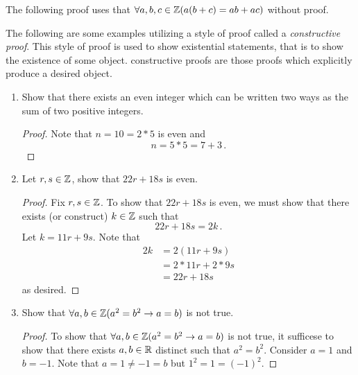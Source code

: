 \guard




The following proof uses that $\forall a,b,c\in\mathbb{Z}(a(b+c)=ab+ac)$ without proof.

The following are some examples utilizing a style of proof called a \emph{constructive proof}.
This style of proof is used to show existential statements, that is to show the existence of some object.
constructive proofs are those proofs which explicitly produce a desired object.

\begin{exmp}
\label{exmp:constructiveProofs}
  \begin{enumerate}
    \item  Show that there exists an even integer which can be written two ways as the sum of two positive integers.\\
      \begin{proof}
        Note that $n=10=2*5$ is even and \[ n = 5*5 = 7+3 \,.\]
      \end{proof}
    \item Let $r,s\in\mathbb{Z}$, show that $22r+18s$ is even.
      \begin{proof}
        Fix $r,s\in\mathbb{Z}$.
        To show that $22r+18s$ is even, we must show  that there exists (or construct) $k\in\mathbb{Z}$ such that \[ 22r + 18s = 2k\,.\]
        Let $k=11r+9s$.
        Note that
        \begin{align*}
          2k  &= 2(11r+9s)\\
              &= 2*11r + 2*9s\\
              &= 22r + 18s
        \end{align*}
        as desired.
      \end{proof}
    \item Show that $\forall a,b\in\mathbb{Z}(a^2=b^2 \rightarrow a=b )$ is not true.
    \begin{proof}
      To show that $\forall a,b\in\mathbb{Z}(a^2=b^2 \rightarrow a=b )$ is not true, it sufficese to show that there exists $a,b\in\mathbb{R}$ distinct such that $a^2=b^2$.
      Consider $a=1$ and $b=-1$.
      Note that $a=1\not=-1=b$ but $1^2=1=(-1)^2$.
    \end{proof}
  \end{enumerate}
\end{exmp}
